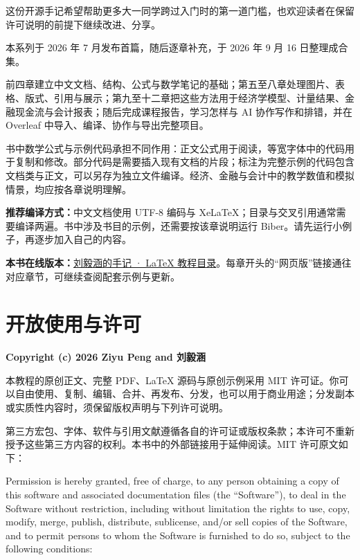 \documentclass[UTF8,a4paper,11pt,fontset=fandol,oneside,openany]{ctexbook}
\begin{document}
这份开源手记希望帮助更多大一同学跨过入门时的第一道门槛，也欢迎读者在保留许可说明的前提下继续改进、分享。

本系列于 2026 年 7 月发布首篇，随后逐章补充，于 2026 年 9 月 16 日整理成合集。

前四章建立中文文档、结构、公式与数学笔记的基础；第五至八章处理图片、表格、版式、引用与展示；第九至十二章把这些方法用于经济学模型、计量结果、金融现金流与会计报表；随后完成课程报告，学习怎样与 AI 协作写作和排错，并在 Overleaf 中导入、编译、协作与导出完整项目。

书中数学公式与示例代码承担不同作用：正文公式用于阅读，等宽字体中的代码用于复制和修改。部分代码是需要插入现有文档的片段；标注为完整示例的代码包含文档类与正文，可以另存为独立文件编译。经济、金融与会计中的教学数值和模拟情景，均应按各章说明理解。

\noindent\textbf{推荐编译方式：}中文文档使用 UTF-8 编码与 XeLaTeX；目录与交叉引用通常需要编译两遍。书中涉及书目的示例，还需要按该章说明运行 Biber。请先运行小例子，再逐步加入自己的内容。

\noindent\textbf{本书在线版本：}\href{https://pzy54154631-hub.github.io/liuyihan/blog/latex/}{刘毅涵的手记 · LaTeX 教程目录}。每章开头的“网页版”链接通往对应章节，可继续查阅配套示例与更新。

\chapter*{开放使用与许可}
\noindent\textbf{Copyright (c) 2026 Ziyu Peng and 刘毅涵}

本教程的原创正文、完整 PDF、LaTeX 源码与原创示例采用 MIT 许可证。你可以自由使用、复制、编辑、合并、再发布、分发，也可以用于商业用途；分发副本或实质性内容时，须保留版权声明与下列许可说明。

第三方宏包、字体、软件与引用文献遵循各自的许可证或版权条款；本许可不重新授予这些第三方内容的权利。本书中的外部链接用于延伸阅读。MIT 许可原文如下：

\begingroup\small\setlength{\parindent}{0pt}\setlength{\parskip}{0.6em}
Permission is hereby granted, free of charge, to any person obtaining a copy of this software and associated documentation files (the ``Software''), to deal in the Software without restriction, including without limitation the rights to use, copy, modify, merge, publish, distribute, sublicense, and/or sell copies of the Software, and to permit persons to whom the Software is furnished to do so, subject to the following conditions:
\end{document}
